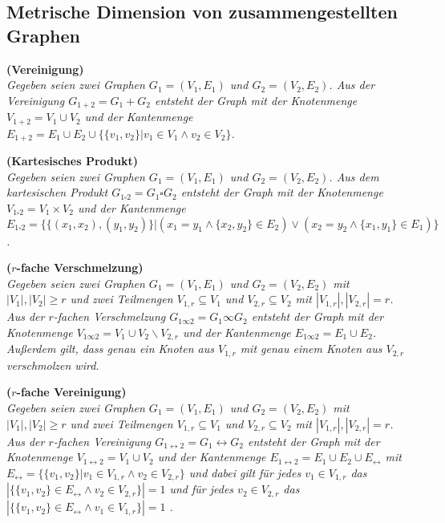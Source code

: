 \subsection{Metrische Dimension von zusammengestellten Graphen}
\begin{defi}{\textbf{(Vereinigung)}}\\
\emph{Gegeben seien zwei Graphen $G_1=(V_1,E_1)$ und $G_2=(V_2,E_2)$. Aus der Vereinigung $G_{1+2}=G_1+G_2$ entsteht der Graph mit der Knotenmenge $V_{1+2}=V_1 \cup V_2$ und der Kantenmenge $E_{1+2}= E_1 \cup E_2 \cup \{\{v_1,v_2\}| v_1 \in V_1 \wedge v_2 \in V_2\}$.} 
\end{defi}

\begin{defi}{\textbf{(Kartesisches Produkt)}}\\
\emph{Gegeben seien zwei Graphen $G_1=(V_1,E_1)$ und $G_2=(V_2,E_2)$. Aus dem kartesischen Produkt $G_{1\square 2}=G_1 \square G_2$ entsteht der Graph mit der Knotenmenge $V_{1 \square 2}=V_1 \times V_2$ und der Kantenmenge $E_{1\square 2}= \{\{(x_1,x_2),(y_1,y_2)\}| (x_1=y_1 \wedge \{x_2,y_2\} \in E_2)\vee (x_2=y_2 \wedge \{x_1,y_1\} \in E_1)\}$.} 
\end{defi}

\begin{defi}{\textbf{($r$-fache Verschmelzung)}}\\
\emph{Gegeben seien zwei Graphen $G_1=(V_1,E_1)$ und $G_2=(V_2,E_2)$ mit $|V_1|, |V_2| \geq r$ und zwei Teilmengen $V_{1,r} \subseteq V_1$ und $V_{2,r} \subseteq V_2$ mit $|V_{1,r}|, |V_{2,r}| = r$. Aus der $r$-fachen Verschmelzung $G_{1 \infty 2}=G_1 \infty G_2$ entsteht der Graph mit der Knotenmenge $V_{1 \infty 2}=V_1 \cup V_2\backslash V_{2,r}$ und der Kantenmenge $E_{1\infty 2}= E_1 \cup E_2$. Außerdem gilt, dass genau ein Knoten aus $V_{1,r}$ mit genau einem Knoten aus $V_{2,r}$ verschmolzen wird.} 
\end{defi}

\begin{defi}{\textbf{($r$-fache Vereinigung)}}\\
\emph{Gegeben seien zwei Graphen $G_1=(V_1,E_1)$ und $G_2=(V_2,E_2)$ mit $|V_1|, |V_2| \geq r$ und zwei Teilmengen $V_{1,r} \subseteq V_1$ und $V_{2,r} \subseteq V_2$ mit $|V_{1,r}|, |V_{2,r}| = r$. 
Aus der $r$-fachen Vereinigung $G_{1 \leftrightarrow 2}= G_1 \leftrightarrow G_2$ entsteht der Graph mit der Knotenmenge $V_{1 \leftrightarrow 2}=V_1 \cup V_2$ und der Kantenmenge $E_{1\leftrightarrow 2}= E_1 \cup E_2 \cup E_{\leftrightarrow }$ mit $E_{\leftrightarrow}=\{\{v_1,v_2\}| v_1 \in V_{1,r} \wedge v_2 \in V_{2,r} \}$ und dabei gilt für jedes $v_1 \in V_{1,r}$ das $|\{\{v_1,v_2\} \in E_{\leftrightarrow} \wedge  v_2 \in V_{2,r} \}|= 1$ und für jedes $v_2 \in V_{2,r}$ das $|\{\{v_1,v_2\} \in E_{\leftrightarrow} \wedge v_1 \in V_{1,r} \}|= 1$ .} 
\end{defi}

